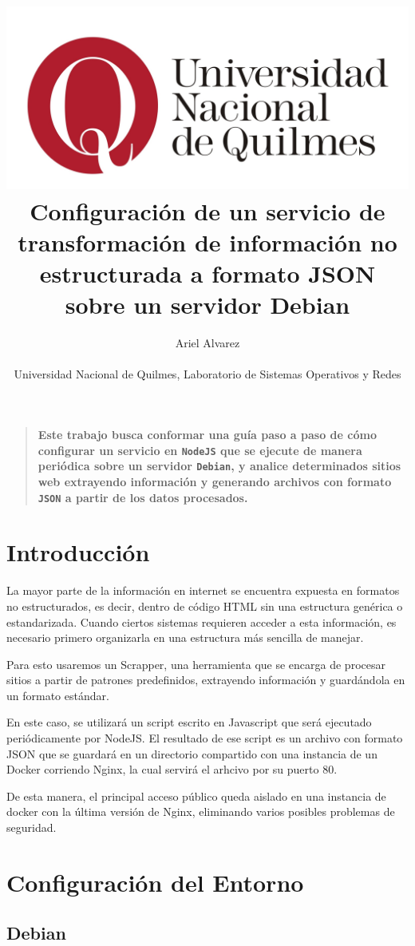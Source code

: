 \documentclass[12pt]{article}
\title{
\includegraphics[width=\textwidth,height=\textheight,keepaspectratio]{logo-unq.jpg}\\[1cm]
Configuración de un servicio de transformación de información no estructurada a formato JSON sobre un servidor Debian
}
\author
{Ariel Alvarez\\
\\
\normalsize{Universidad Nacional de Quilmes, Laboratorio de Sistemas Operativos y Redes}
}
\newenvironment{sciabstract}{%
\begin{quote} \bf}
{\end{quote}}
\begin{document}
 


\baselineskip24pt

\maketitle 

\begin{sciabstract}
  Este trabajo busca conformar una guía paso a paso de cómo configurar un servicio en \texttt{NodeJS} que se ejecute de manera periódica sobre un servidor \texttt{Debian}, y analice determinados sitios web extrayendo información y generando archivos con formato \texttt{JSON} a partir de los datos procesados.
\end{sciabstract}


\section{Introducción}

La mayor parte de la información en internet se encuentra expuesta en formatos no estructurados, es decir, dentro de código HTML sin una estructura genérica o estandarizada. Cuando ciertos sistemas requieren acceder a esta información, es necesario primero organizarla en una estructura más sencilla de manejar.

Para esto usaremos un Scrapper, una herramienta que se encarga de procesar sitios a partir de patrones predefinidos, extrayendo información y guardándola en un formato estándar.

En este caso, se utilizará un script escrito en Javascript que será ejecutado periódicamente por NodeJS. El resultado de ese script es un archivo con formato JSON que se guardará en un directorio compartido con una instancia de un Docker corriendo Nginx, la cual servirá el arhcivo por su puerto 80.

De esta manera, el principal acceso público queda aislado en una instancia de docker con la última versión de Nginx, eliminando varios posibles problemas de seguridad.

\section{Configuración del Entorno}

\subsection{Debian}
\end{document}
